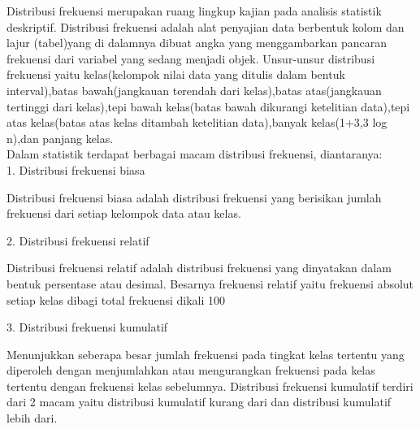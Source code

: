 \documentclass[a4paper,10pt]{article}
\begin{document}
\begin{eulernotebook}
\begin{eulercomment}
\end{eulercomment}
\begin{eulercomment}
Distribusi frekuensi merupakan ruang lingkup kajian pada analisis
statistik deskriptif. Distribusi frekuensi adalah alat penyajian data
berbentuk kolom dan lajur (tabel)yang di dalamnya dibuat angka yang
menggambarkan pancaran frekuensi dari variabel yang sedang menjadi
objek. Unsur-unsur distribusi frekuensi yaitu kelas(kelompok nilai
data yang ditulis dalam bentuk interval),batas bawah(jangkauan
terendah dari kelas),batas atas(jangkauan tertinggi dari kelas),tepi
bawah kelas(batas bawah dikurangi ketelitian data),tepi atas
kelas(batas atas kelas ditambah ketelitian data),banyak kelas(1+3,3
log n),dan panjang kelas.\\
Dalam statistik terdapat berbagai macam distribusi frekuensi,
diantaranya:\\
1. Distribusi frekuensi biasa\\
\end{eulercomment}
\begin{eulerttcomment}
   Distribusi frekuensi biasa adalah distribusi
   frekuensi yang berisikan jumlah frekuensi
   dari setiap kelompok data atau kelas.
\end{eulerttcomment}
\begin{eulercomment}
2. Distribusi frekuensi relatif\\
\end{eulercomment}
\begin{eulerttcomment}
   Distribusi frekuensi relatif adalah
   distribusi frekuensi yang dinyatakan dalam
   bentuk persentase atau desimal. Besarnya
   frekuensi relatif yaitu frekuensi absolut
   setiap kelas dibagi total frekuensi dikali
   100%
\end{eulerttcomment}
\begin{eulercomment}
3. Distribusi frekuensi kumulatif\\
\end{eulercomment}
\begin{eulerttcomment}
   Menunjukkan seberapa besar jumlah frekuensi
   pada tingkat kelas tertentu yang diperoleh
   dengan menjumlahkan atau mengurangkan
   frekuensi pada kelas tertentu dengan
   frekuensi kelas sebelumnya. Distribusi
   frekuensi kumulatif terdiri dari 2 macam
   yaitu distribusi kumulatif kurang dari dan
   distribusi kumulatif lebih dari.
\end{eulerttcomment}
\begin{eulercomment}


\end{eulercomment}
\end{eulernotebook}
\end{document}
